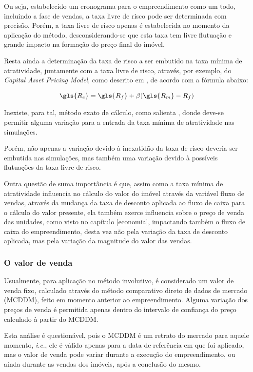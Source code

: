 \documentclass[
	12pt,				%
	oneside,			%
	a4paper,			%
	chapter=TITLE,		%
	section=TITLE,		%
	english,			%
	brazil				%
	]{abntex2}
\begin{document}
Ou seja, estabelecido um cronograma para o empreendimento como um todo,
incluindo a fase de vendas, a taxa livre de risco pode ser determinada
com precisão. Porém, a taxa livre de risco apenas é estabelecida no
momento da aplicação do método, desconsiderando-se que esta taxa tem
livre flutuação e grande impacto na formação do preço final do imóvel.

Resta ainda a determinação da taxa de risco a ser embutido na taxa
mínima de atratividade, juntamente com a taxa livre de risco, através,
por exemplo, do \emph{Capital Asset Pricing Model}, como descrito em
\textcites{gahochheim}[69-73]{gahochheim}, de acordo com a fórmula
abaixo:

\[\gls{R_e}= \gls{R_f} + \beta(\gls{R_m} - R_f)\]

Inexiste, para tal, método exato de cálculo, como salienta
\textcite{gahochheim}, donde deve-se permitir alguma variação para a
entrada da taxa mínima de atratividade nas simulações.

Porém, não apenas a variação devido à inexatidão da taxa de risco
deveria ser embutida nas simulações, mas também uma variação devido à
possíveis flutuações da taxa livre de risco.

Outra questão de suma importância é que, assim como a taxa mínima de
atratividade influencia no cálculo do valor do imóvel através da
variável fluxo de vendas, através da mudança da taxa de desconto
aplicada ao fluxo de caixa para o cálculo do valor presente, ela também
exerce influencia sobre o preço de venda das unidades, como visto no
capítulo \ref{economia}, impactando também o fluxo de caixa do
empreendimento, desta vez não pela variação da taxa de desconto
aplicada, mas pela variação da magnitude do valor das vendas.

\subsubsection{O valor de venda}\label{o-valor-de-venda}

Usualmente, para aplicação no método involutivo, é considerado um valor
de venda fixo, calculado através do método comparativo direto de dados
de mercado (MCDDM), feito em momento anterior ao empreendimento. Alguma
variação dos preços de venda é permitida apenas dentro do intervalo de
confiança do preço calculado à partir do MCDDM.

Esta análise é questionável, pois o MCDDM é um retrato do mercado para
aquele momento, \emph{i.e.}, ele é válido apenas para a data de
referência em que foi aplicado, mas o valor de venda pode variar durante
a execução do empreendimento, ou ainda durante as vendas dos imóveis,
após a conclusão do mesmo.
\end{document}
